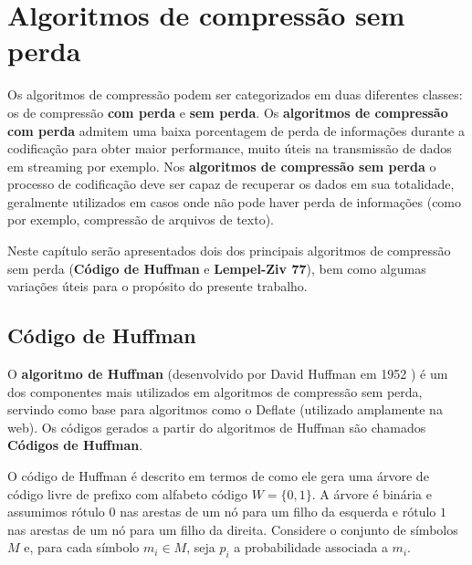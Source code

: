 \chapter{Algoritmos de compressão sem perda}\label{cap:comp}

Os algoritmos de compressão podem ser categorizados em duas diferentes classes: os de compressão \textbf{com perda} e \textbf{sem perda}. 
Os \textbf{algoritmos de compressão com perda} admitem uma baixa porcentagem de perda de informações durante a codificação para obter maior performance, muito úteis na transmissão de dados em streaming por exemplo. 
Nos \textbf{algoritmos de compressão sem perda} o processo de codificação deve ser capaz de recuperar os dados em sua totalidade, geralmente utilizados em casos onde não pode haver perda de informações (como por exemplo, compressão de arquivos de texto).

Neste capítulo serão apresentados dois dos principais algoritmos de compressão sem perda (\textbf{Código de Huffman} e \textbf{Lempel-Ziv 77}), bem como algumas variações úteis para o propósito do presente trabalho.

\pagebreak

\section{Código de Huffman} \label{sec:huff}
O \textbf{algoritmo de Huffman} (desenvolvido por David Huffman em 1952 \cite{Huff}) é um dos componentes mais utilizados em algoritmos de compressão sem perda, servindo como base para algoritmos como o Deflate (utilizado amplamente na web).
Os códigos gerados a partir do algoritmos de Huffman são chamados \textbf{Códigos de Huffman}.

O código de Huffman é descrito em termos de como ele gera uma árvore
de código livre de prefixo com alfabeto código $W = \{0,1\}$. A árvore
é binária e assumimos rótulo $0$ nas arestas de um nó para um filho da
esquerda e rótulo $1$ nas arestas de um nó para um filho da direita.
Considere o conjunto de símbolos $M$ e, para cada símbolo $m_i\in M$,
seja $p_i$ a probabilidade associada a $m_i$.

